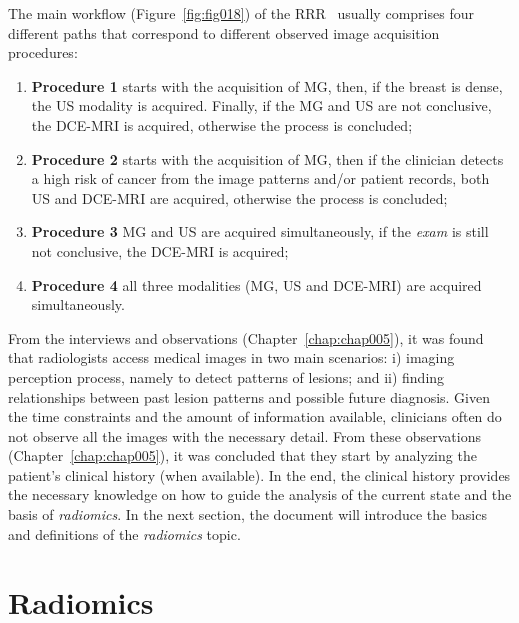 \hfill

\noindent
The main workflow (Figure~\ref{fig:fig018}) of the \ac{RRR}~\cite{wagner2015analysis} usually comprises four different paths that correspond to different observed image acquisition procedures:

\begin{enumerate}
\item \textbf{Procedure 1} starts with the acquisition of \ac{MG}, then, if the breast is dense, the \ac{US} modality is acquired. Finally, if the \ac{MG} and \ac{US} are not conclusive, the \ac{DCE}-\ac{MRI} is acquired, otherwise the process is concluded;
\item \textbf{Procedure 2} starts with the acquisition of \ac{MG}, then if the clinician detects a high risk of cancer from the image patterns and/or patient records, both \ac{US} and \ac{DCE}-\ac{MRI} are acquired, otherwise the process is concluded;
\item \textbf{Procedure 3} \ac{MG} and \ac{US} are acquired simultaneously, if the {\it exam} is still not conclusive, the \ac{DCE}-\ac{MRI} is acquired;
\item \textbf{Procedure 4} all three modalities (\ac{MG}, \ac{US} and \ac{DCE}-\ac{MRI}) are acquired simultaneously.
\end{enumerate}

\hfill

From the interviews and observations (Chapter~\ref{chap:chap005}), it was found that radiologists access medical images in two main scenarios:
i) imaging perception process, namely to detect patterns of lesions;
and ii) finding relationships between past lesion patterns and possible future diagnosis.
Given the time constraints and the amount of information available, clinicians often do not observe all the images with the necessary detail.
From these observations (Chapter~\ref{chap:chap005}), it was concluded that they start by analyzing the patient's clinical history (when available).
In the end, the clinical history provides the necessary knowledge on how to guide the analysis of the current state and the basis of {\it radiomics}.
In the next section, the document will introduce the basics and definitions of the {\it radiomics} topic.

\section{Radiomics}
\label{sec:chap002006}

